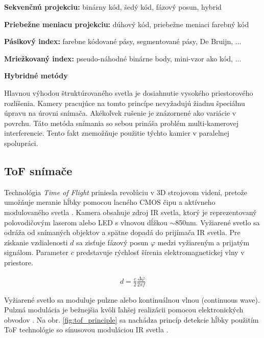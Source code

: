 \begin{compactitem}
	\item \textbf{Sekvenčnú projekciu:} binárny kód, šedý kód, fázový posun, hybrid 
	\item \textbf{Priebežne meniacu projekciu:} dúhový kód, priebežne meniaci farebný kód 
	\item \textbf{Pásikový index:} farebne kódované pásy, segmentované pásy, De Bruijn, ...
	\item \textbf{Mriežkovaný index:} pseudo-náhodné binárne body, mini-vzor ako kód, ...
	\item \textbf{Hybridné metódy} 
\end{compactitem}

Hlavnou výhodou štruktúrovaného svetla je dosiahnutie vysokého priestorového rozlíšenia. Kamery pracujúce na tomto princípe nevyžadujú žiadnu špeciálnu úpravu na úrovni snímača. Akékoľvek rušenie je znázornené ako variácie v povrchu. Táto metóda snímania so sebou prináša problém multi-kamerovej interferencie. Tento fakt znemožňuje použitie týchto kamier v paralelnej spolupráci.



\subsection{ToF snímače}
\label{sec:tof}

Technológia \textit{Time of Flight} priniesla revolúciu v 3D strojovom videní, pretože umožňuje meranie hĺbky pomocou lacného CMOS čipu a aktívneho modulovaného svetla \cite{li2014time}. Kamera obsahuje zdroj IR svetla, ktorý je reprezentovaný polovodičovým laserom alebo LED s vlnovou dĺžkou $\sim$850nm. Vyžiarené svetlo sa odráža od snímaných objektov a spätne dopadá do prijímača IR svetla. Pre získanie vzdialenosti $d$ sa zisťuje fázový posun $\varphi$ medzi vyžiareným a prijatým signálom. Parameter $c$ predstavuje rýchlosť šírenia elektromagnetickej vlny v priestore. 

\begin{equation}
\label{eq2}
\begin{aligned}
d=\frac{c}{2}\frac{\Delta \varphi}{2 \pi f}
\end{aligned}
\end{equation}

Vyžiarené svetlo sa moduluje pulzne alebo kontinuálnou vlnou (continuous wave). Pulzná modulácia je bežnejšia kvôli ľahšej realizácii pomocou elektronických obvodov \cite{hansard2012time}. Na obr. \ref{fig:tof_principle} sa nachádza princíp detekcie hĺbky použitím ToF technológie so sínusovou moduláciou IR svetla \cite{van2006time}.

